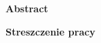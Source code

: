 \documentclass[a4paper,12pt]{article}
\begin{document}



\thispagestyle{empty}
\vspace*{\fill}
\centerline{\large\bf Abstract}
\vspace{2cm}
\zstreszczenie
\vspace*{\fill}

\clearpage

\thispagestyle{empty}
\vspace*{\fill}
\centerline{\large\bf Streszczenie pracy}
\vspace{2cm}
\@streszczeniepl
\vspace*{\fill}
\end{document}
